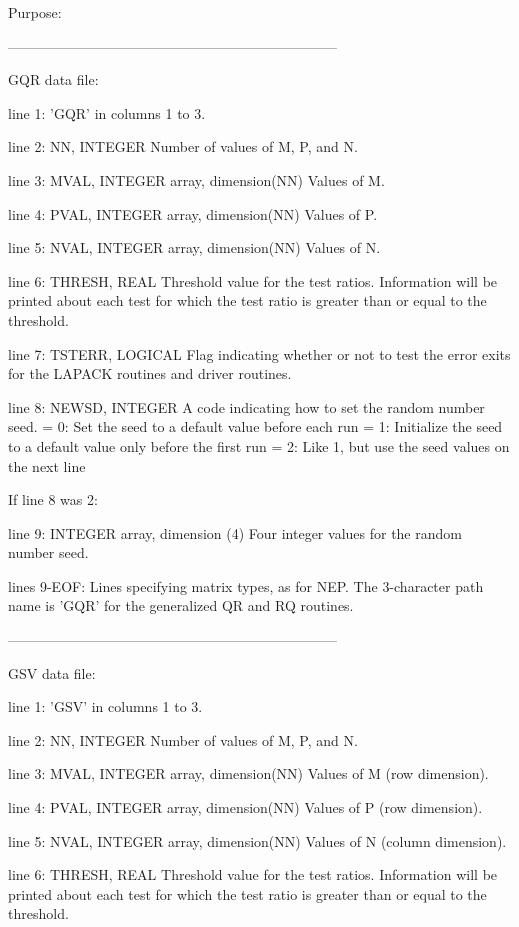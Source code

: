 \begin{DoxyParagraph}{Purpose\+: }
\begin{DoxyVerb}
-----------------------------------------------------------------------

 GQR data file:

 line 1:  'GQR' in columns 1 to 3.

 line 2:  NN, INTEGER
          Number of values of M, P, and N.

 line 3:  MVAL, INTEGER array, dimension(NN)
          Values of M.

 line 4:  PVAL, INTEGER array, dimension(NN)
          Values of P.

 line 5:  NVAL, INTEGER array, dimension(NN)
          Values of N.

 line 6:  THRESH, REAL
          Threshold value for the test ratios.  Information will be
          printed about each test for which the test ratio is greater
          than or equal to the threshold.

 line 7:  TSTERR, LOGICAL
          Flag indicating whether or not to test the error exits for
          the LAPACK routines and driver routines.

 line 8:  NEWSD, INTEGER
          A code indicating how to set the random number seed.
          = 0:  Set the seed to a default value before each run
          = 1:  Initialize the seed to a default value only before the
                first run
          = 2:  Like 1, but use the seed values on the next line

 If line 8 was 2:

 line 9:  INTEGER array, dimension (4)
          Four integer values for the random number seed.

 lines 9-EOF:  Lines specifying matrix types, as for NEP.
          The 3-character path name is 'GQR' for the generalized
          QR and RQ routines.

-----------------------------------------------------------------------

 GSV data file:

 line 1:  'GSV' in columns 1 to 3.

 line 2:  NN, INTEGER
          Number of values of M, P, and N.

 line 3:  MVAL, INTEGER array, dimension(NN)
          Values of M (row dimension).

 line 4:  PVAL, INTEGER array, dimension(NN)
          Values of P (row dimension).

 line 5:  NVAL, INTEGER array, dimension(NN)
          Values of N (column dimension).

 line 6:  THRESH, REAL
          Threshold value for the test ratios.  Information will be
          printed about each test for which the test ratio is greater
          than or equal to the threshold.


\end{DoxyVerb}
\end{DoxyParagraph}
